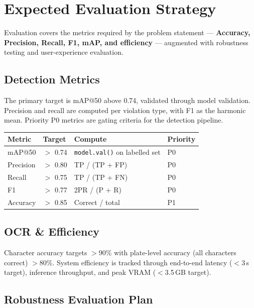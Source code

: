 \documentclass[11pt,a4paper]{article}
\newcommand{\sectionrule}{\noindent{\color{vigilaccent}\rule{0.22\linewidth}{2.2pt}}{\color{vigilaccent!30}\rule{0.78\linewidth}{0.6pt}}\par\vspace{4pt}}
\begin{document}
\section{Expected Evaluation Strategy}
\sectionrule

Evaluation covers the metrics required by the problem statement — \textbf{Accuracy, Precision, Recall, F1, mAP, and efficiency} — augmented with robustness testing and user-experience evaluation.

\subsection{Detection Metrics}

The primary target is mAP@50 above 0.74, validated through model validation. Precision and recall are computed per violation type, with F1 as the harmonic mean. Priority P0 metrics are gating criteria for the detection pipeline.

\begin{longtable}{@{}p{2.6cm}p{2.2cm}p{6cm}p{1.4cm}@{}}
\hline
\textbf{Metric} & \textbf{Target} & \textbf{Compute} & \textbf{Priority} \\
\hline
mAP@50 & $>$ 0.74 & \texttt{model.val()} on labelled set & P0 \\
Precision & $>$ 0.80 & TP / (TP + FP) & P0 \\
Recall & $>$ 0.75 & TP / (TP + FN) & P0 \\
F1 & $>$ 0.77 & 2PR / (P + R) & P0 \\
Accuracy & $>$ 0.85 & Correct / total & P1 \\
\hline
\end{longtable}

\subsection{OCR \& Efficiency}

Character accuracy targets $>$90\% with plate-level accuracy (all characters correct) $>$80\%. System efficiency is tracked through end-to-end latency ($<$3\,s target), inference throughput, and peak VRAM ($<$3.5\,GB target).

\subsection{Robustness Evaluation Plan}
\end{document}

